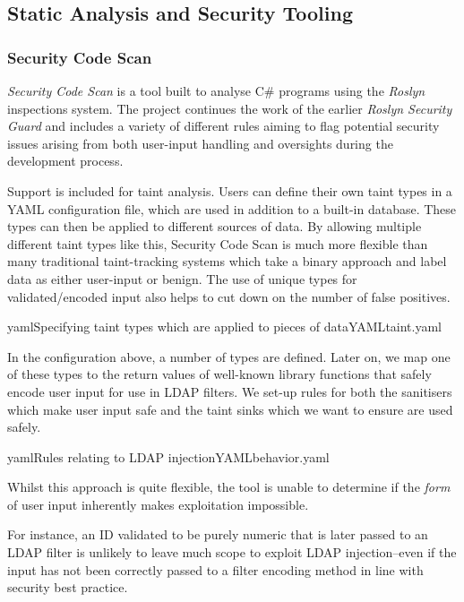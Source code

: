 \documentclass[a4paper,openany,12pt]{book}
\begin{document}
\subsection{Static Analysis and Security Tooling}

\subsubsection{Security Code Scan}

\emph{Security Code Scan} is a tool built to analyse C\# programs using the \emph{Roslyn} inspections system.
The project continues the work of the earlier \emph{Roslyn Security Guard} and includes a variety of different rules
aiming to flag potential security issues arising from both user-input handling and oversights during the development
process.

Support is included for taint analysis.
Users can define their own taint types in a YAML configuration file, which are used in addition to a built-in database.
These types can then be applied to different sources of data.
By allowing multiple different taint types like this, Security Code Scan is much more flexible than many traditional
taint-tracking systems which take a binary approach and label data as either user-input or benign.
The use of unique types for validated/encoded input also helps to cut down on the number of false positives.


\begin{mycodefile}{yaml}{\label{code:scs:1}Specifying taint types which are applied to pieces of data}{YAML}{taint.yaml}
\end{mycodefile}

In the configuration above, a number of types are defined. Later on, we map one of these types to the return values of
well-known library functions that safely encode user input for use in LDAP filters.
We set-up rules for both the sanitisers which make user input safe and the taint sinks which we want to ensure are used
safely.

\begin{mycodefile}{yaml}{\label{code:scs:2}Rules relating to LDAP injection}{YAML}{behavior.yaml}
\end{mycodefile}

Whilst this approach is quite flexible, the tool is unable to determine if the \textit{form} of user input inherently
makes exploitation impossible.

For instance, an ID validated to be purely numeric that is later passed to an LDAP filter is unlikely to leave much
scope to exploit LDAP injection--even if the input has not been correctly passed to a filter encoding method in
line with security best practice.
\end{document}
